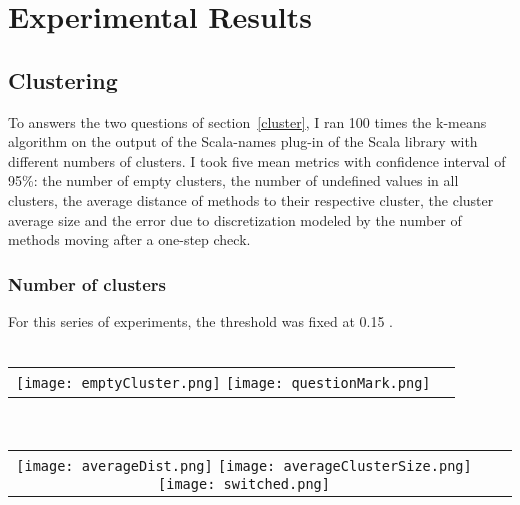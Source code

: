 \documentclass[12pt]{article}
\begin{document}
\section {Experimental Results}

\subsection {Clustering}
\label{cluster:exp}
To answers the two questions of section~\ref{cluster}, I ran 100 times the k-means algorithm on the output of the Scala-names plug-in of the Scala library with different numbers of clusters. I took five mean metrics with confidence interval of 95\%: the number of empty clusters, the number of undefined values in all clusters, the average distance of methods to their respective cluster, the cluster average size and the error due to discretization modeled by the number of methods moving after a one-step check. 
\subsubsection{Number of clusters}
For this series of experiments, the threshold was fixed at 0.15 . 
\\ \\
\begin{center}
\begin{tabular}{c c}
\texttt{[image: emptyCluster.png]}
\texttt{[image: questionMark.png]}
\end{tabular}\\
\begin{tabular}{c c c}
\texttt{[image: averageDist.png]}
\texttt{[image: averageClusterSize.png]}
\texttt{[image: switched.png]} %
\end{tabular}
\end{center}
\end{document}
